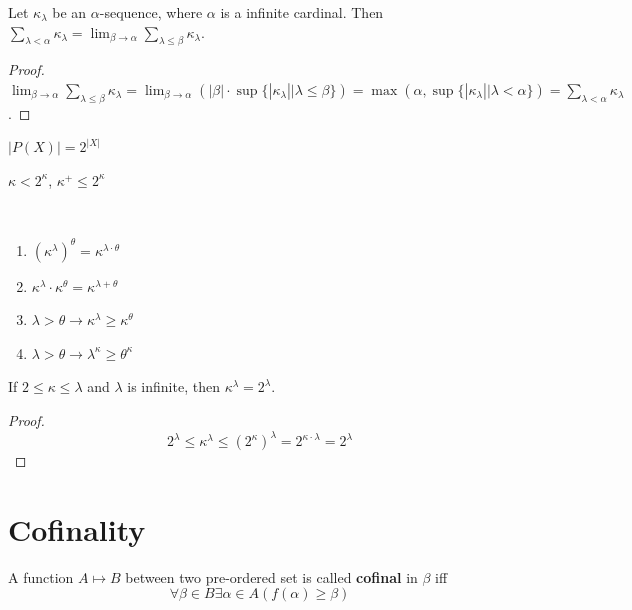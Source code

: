 \documentclass[12pt]{book}
\begin{document}
\begin{lemma}
	Let $\kappa_\lambda$ be an $\alpha$-sequence, where $\alpha$ is a infinite cardinal. Then $\sum_{\lambda<\alpha}\kappa_\lambda=\lim_{\beta\rightarrow\alpha}\sum_{\lambda\leq\beta}\kappa_\lambda$.
\end{lemma}
\begin{proof}
	$\lim_{\beta\rightarrow\alpha}\sum_{\lambda\leq\beta}\kappa_\lambda=\lim_{\beta\rightarrow\alpha}(|\beta|\cdot\sup\{|\kappa_\lambda||\lambda\leq\beta\})=\max(\alpha,\sup\{|\kappa_\lambda||\lambda<\alpha\})=\sum_{\lambda<\alpha}\kappa_\lambda$.
\end{proof}

\begin{lemma}
	$|P(X)|=2^{|X|}$
\end{lemma}
\begin{corollary}
	$\kappa<2^\kappa$, $\kappa^+\leq 2^\kappa$
\end{corollary}

\begin{lemma}
	\
	\begin{enumerate}
		\item $(\kappa^\lambda)^\theta=\kappa^{\lambda\cdot\theta}$
		\item $\kappa^\lambda\cdot\kappa^\theta=\kappa^{\lambda+\theta}$
		\item $\lambda>\theta\rightarrow \kappa^\lambda\geq\kappa^\theta$
		\item $\lambda>\theta\rightarrow \lambda^\kappa\geq\theta^\kappa$
	\end{enumerate}
\end{lemma}

\begin{lemma}
	If $2\leq\kappa\leq\lambda$ and $\lambda$ is infinite, then $\kappa^\lambda=2^\lambda$.
\end{lemma}
\begin{proof}
	\begin{equation}
		2^\lambda\leq \kappa^\lambda\leq(2^\kappa)^\lambda=2^{\kappa\cdot\lambda}=2^\lambda
	\end{equation}
\end{proof}

\section{Cofinality}

\begin{definition}
	A function $A\mapsto B$ between two pre-ordered set is called {\bf cofinal} in $\beta$ iff 
	\begin{equation}
		\forall \beta\in B\exists \alpha\in A(f(\alpha)\geq\beta)
	\end{equation}
\end{definition}
\end{document}
